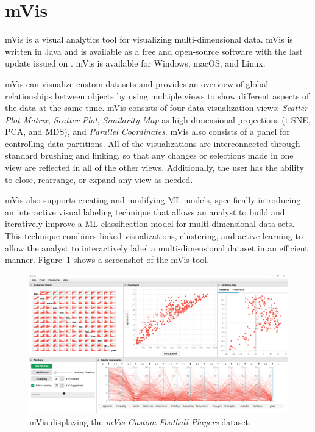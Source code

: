 \section{mVis}

mVis \parencite{chegini2019interactive} is a visual analytics tool for visualizing
multi-dimensional data. mVis is written in Java and is available as a free
and open-source software with the last update issued on
. mVis is available for Windows, macOS, and
Linux.

mVis can visualize custom datasets and provides an overview of global
relationships between objects by using multiple views to show different
aspects of the data at the same time. mVis consists of four data
visualization views: \emph{Scatter Plot Matrix}, \emph{Scatter Plot},
\emph{Similarity Map} as high dimensional projections (t-SNE, PCA, and
MDS), and \emph{Parallel Coordinates}. mVis also consists of a panel for
controlling data partitions. All of the visualizations are interconnected
through standard brushing and linking, so that any changes or selections
made in one view are reflected in all of the other views. Additionally,
the user has the ability to close, rearrange, or expand any view as
needed.

mVis also supports creating and modifying ML models, specifically
introducing an interactive visual labeling technique that allows an
analyst to build and iteratively improve a ML classification model for
multi-dimensional data sets. This technique combines linked
visualizations, clustering, and active learning to allow the analyst to
interactively label a multi-dimensional dataset in an efficient manner.
Figure~\ref{fig:ScreenshotMVis} shows a screenshot of the mVis tool.




\begin{figure}[tp]
\centering
\includegraphics[keepaspectratio,width=\linewidth,height=\halfh,frame]
{images/screenshot-mvis.png}

\caption[mVis]
{%
mVis displaying the \emph{mVis Custom Football Players} dataset.
}
\label{fig:ScreenshotMVis}
\end{figure}



